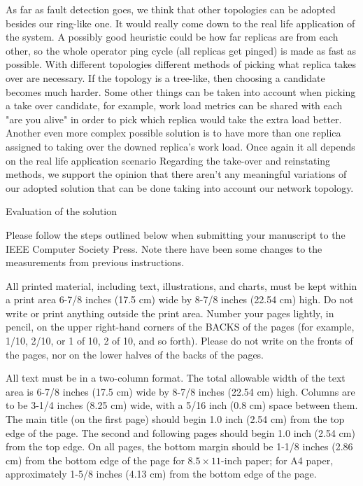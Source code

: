 \documentclass[times, 10pt,twocolumn]{article}
\begin{document}
As far as fault detection goes, we think that other topologies can be
adopted besides our ring-like one. It would really come down to the real
life application of the system. A possibly good heuristic could be how far
replicas are from each other, so the whole operator ping cycle (all
replicas get pinged) is made as fast as possible. With different
topologies different methods of picking what replica takes over are
necessary. If the topology is a tree-like, then choosing a candidate
becomes much harder. Some other things can be taken into account when
picking a take over candidate, for example, work load metrics can be
shared with each "are you alive" in order to pick which replica would take
the extra load better. Another even more complex possible solution is to
have more than one replica assigned to taking over the downed replica's
work load. Once again it all depends on the real life application scenario
Regarding the take-over and reinstating methods, we support the opinion
that there aren't any meaningful variations of our adopted solution that
can be done taking into account our network topology.

Evaluation of the solution


Please follow the steps outlined below when submitting your manuscript to
the IEEE Computer Society Press. Note there have been some changes to the
measurements from previous instructions. 


All printed material, including text, illustrations, and charts, must be
kept within a print area 6-7/8 inches (17.5 cm) wide by 8-7/8 inches
(22.54 cm) high.  Do not write or print anything outside the print area.
Number your pages lightly, in pencil, on the upper right-hand corners of
the BACKS of the pages (for example, 1/10, 2/10, or 1 of 10, 2 of 10, and
so forth). Please do not write on the fronts of the pages, nor on the
lower halves of the backs of the pages.



All text must be in a two-column format. The total allowable width of the
text area is 6-7/8 inches (17.5 cm) wide by 8-7/8 inches (22.54 cm) high.
Columns are to be 3-1/4 inches (8.25 cm) wide, with a 5/16 inch (0.8 cm)
space between them.  The main title (on the first page) should begin 1.0
inch (2.54 cm) from the top edge of the page. The second and following
pages should begin 1.0 inch (2.54 cm) from the top edge. On all pages, the
bottom margin should be 1-1/8 inches (2.86 cm) from the bottom edge of the
page for $8.5 \times 11$-inch paper; for A4 paper, approximately 1-5/8
inches (4.13 cm) from the bottom edge of the page.
\end{document}
